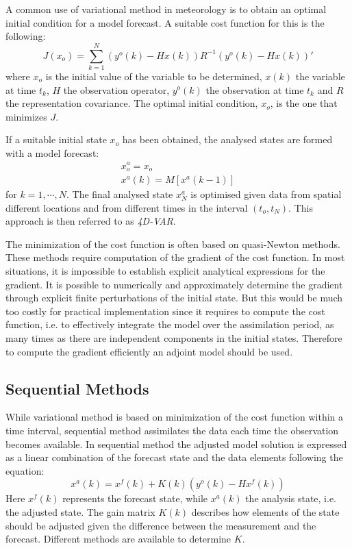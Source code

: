 A common use of variational method in meteorology is to obtain an optimal
initial condition for a model forecast. A suitable cost function for this is
the following:
\begin{equation}\label{eq.costfunction1}
J(x_o) = \sum_{k=1}^N (y^o(k)-Hx(k))R^{-1}(y^o(k)-Hx(k))'
\end{equation}
where $x_o$ is the initial value of the variable to be determined, $x(k)$ the
variable at time $t_k$, $H$ the observation operator, $y^o(k)$ the observation
at time $t_k$ and $R$ the representation covariance. The optimal initial
condition, $x_o$, is the one that minimizes $J$.

If a suitable initial state $x_o$ has been obtained, the analysed states are
formed with a model forecast:
\begin{eqnarray}
x^a_o = x_o \\
x^a(k) = M[x^a(k-1)]
\end{eqnarray}
for $k=1, \cdots, N$. The final analysed state $x^a_N$ is optimised given data
from spatial different locations and from different times in the interval
$(t_o,t_N)$. This approach is then referred to as \emph{4D-VAR}.

The minimization of the cost function is often based on quasi-Newton methods.
These methods require computation of the gradient of the cost function. In most
situations, it is impossible to establish explicit analytical expressions for
the gradient. It is possible to numerically and approximately determine the
gradient through explicit finite perturbations of the initial state. But this
would be much too costly for practical implementation since it requires to
compute the cost function, i.e. to effectively integrate the model over the
assimilation period, as many times as there are independent components in the
initial states. Therefore to compute the gradient efficiently an adjoint model
should be used.

\subsection{Sequential Methods}
While variational method is based on minimization of the cost function within a
time interval, sequential method assimilates the data each time the observation
becomes available. In sequential method the adjusted model solution is
expressed as a linear combination of the forecast state and the data elements
following the equation:
\begin{equation}
x^a(k) = x^f(k) + K(k)(y^o(k)-Hx^f(k))
\end{equation}
Here $x^f(k)$ represents the forecast state, while $x^a(k)$ the analysis state,
i.e. the adjusted state. The gain matrix $K(k)$ describes how elements of the
state should be adjusted given the difference between the measurement and the
forecast. Different methods are available to determine $K$.

